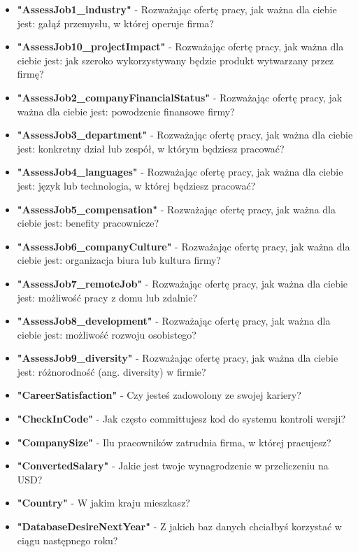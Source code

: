 \begin{appendices}
\begin{itemize}
        \item \textbf{"AssessJob1\_industry"} - Rozważając ofertę pracy, jak ważna dla ciebie jest: gałąź przemysłu, w której operuje firma?
        \item \textbf{"AssessJob10\_projectImpact"} - Rozważając ofertę pracy, jak ważna dla ciebie jest: jak szeroko wykorzystywany będzie produkt wytwarzany przez firmę?
        \item \textbf{"AssessJob2\_companyFinancialStatus"} - Rozważając ofertę pracy, jak ważna dla ciebie jest: powodzenie finansowe firmy?
        \item \textbf{"AssessJob3\_department"} - Rozważając ofertę pracy, jak ważna dla ciebie jest: konkretny dział lub zespół, w którym będziesz pracować?
        \item \textbf{"AssessJob4\_languages"} - Rozważając ofertę pracy, jak ważna dla ciebie jest: język lub technologia, w której będziesz pracować?
        \item \textbf{"AssessJob5\_compensation"} - Rozważając ofertę pracy, jak ważna dla ciebie jest: benefity pracownicze?
        \item \textbf{"AssessJob6\_companyCulture"} - Rozważając ofertę pracy, jak ważna dla ciebie jest: organizacja biura lub kultura firmy?
        \item \textbf{"AssessJob7\_remoteJob"} - Rozważając ofertę pracy, jak ważna dla ciebie jest: możliwość pracy z domu lub zdalnie?
        \item \textbf{"AssessJob8\_development"} - Rozważając ofertę pracy, jak ważna dla ciebie jest: możliwość rozwoju osobistego?
        \item \textbf{"AssessJob9\_diversity"} - Rozważając ofertę pracy, jak ważna dla ciebie jest: różnorodność (ang. diversity) w firmie?
        \item \textbf{"CareerSatisfaction"} - Czy jesteś zadowolony ze swojej kariery?
        \item \textbf{"CheckInCode"} - Jak często committujesz kod do systemu kontroli wersji?
        \item \textbf{"CompanySize"} - Ilu pracowników zatrudnia firma, w której pracujesz?
        \item \textbf{"ConvertedSalary"} - Jakie jest twoje wynagrodzenie w przeliczeniu na USD?
        \item \textbf{"Country"} - W jakim kraju mieszkasz?
        \item \textbf{"DatabaseDesireNextYear"} - Z jakich baz danych chciałbyś korzystać w ciągu następnego roku?

\end{itemize}
\end{appendices}
